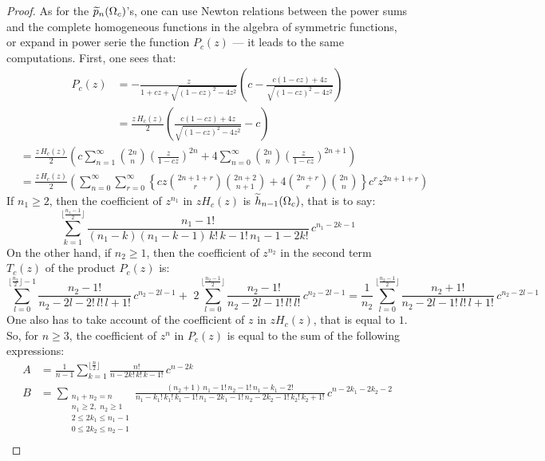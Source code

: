 \documentclass[10pt]{amsart}
\begin{document}
\begin{proof}
As for the $\widetilde{p}_{n}(\Omega_{c})$'s, one can use Newton relations between the power sums and the complete homogeneous functions in the algebra of symmetric functions, or expand in power serie the function $P_{c}(z)$ --- it leads to the same computations. First, one sees that:
\begin{align*}P_{c}(z)&=-\frac{z}{1+cz+\sqrt{(1-cz)^{2}-4z^{2}}}\left(c - \frac{c(1-cz)+4z}{\sqrt{(1-cz)^{2}-4z^{2}}}\right)\\
&=\frac{z\,H_{c}(z)}{2}\left(\frac{c(1-cz)+4z}{\sqrt{(1-cz)^{2}-4z^{2}}}-c\right)\end{align*}
\begin{align*}
&=\frac{z\,H_{c}(z)}{2}\left(c\sum_{n=1}^{\infty}\binom{2n}{n}\left(\frac{z}{1-cz}\right)^{2n}+4\sum_{n=0}^{\infty}\binom{2n}{n}\left(\frac{z}{1-cz}\right)^{2n+1}\right)\\
&=\frac{z\,H_{c}(z)}{2}\left(\sum_{n=0}^{\infty}\sum_{r=0}^{\infty}\left\{cz\binom{2n+1+r}{r}\binom{2n+2}{n+1}+ 4\binom{2n+r}{r}\binom{2n}{n}\right\}c^{r}z^{2n+1+r}\right)
\end{align*}
If $n_{1}\geq 2$, then the coefficient of $z^{n_{1}}$ in $zH_{c}(z)$ is $\widetilde{h}_{n-1}(\Omega_{c})$, that is to say:
$$ \sum_{k=1}^{\lfloor \frac{n_{1}-1}{2}\rfloor} \frac{n_{1}-1!}{(n_{1}-k)(n_{1}-k-1)\,k!\,k-1!\,n_{1}-1-2k!}\,c^{n_{1}-2k-1}$$
On the other hand, if $n_{2} \geq 1$, then the coefficient of $z^{n_{2}}$ in the second term $T_{c}(z)$ of the product $P_{c}(z)$ is: 
$$\sum_{l=0}^{\lfloor \frac{n_{2}}{2}\rfloor-1}\!\!\!\!\frac{n_{2}-1!}{n_{2}-2l-2!\,l!\,l+1!}\,c^{n_{2}-2l-1}+\,\,2\!\!\sum_{l=0}^{\lfloor\frac{n_{2}-1}{2} \rfloor}\!\!\!\!\frac{n_{2}-1!}{n_{2}-2l-1!\,l!\,l!}\,c^{n_{2}-2l-1}=\frac{1}{n_{2}}\!\!\sum_{l=0}^{\lfloor\frac{n_{2}-1}{2}\rfloor}\!\!\!\! \frac{n_{2}+1!}{n_{2}-2l-1!\,l!\,l+1!}\,c^{n_{2}-2l-1}$$
One also has to take account of the coefficient of $z$ in $zH_{c}(z)$, that is equal to $1$. So, for $n \geq 3$, the coefficient of $z^{n}$ in $P_{c}(z)$ is equal to the sum of the following expressions:
\begin{align*}
A&=\frac{1}{n-1}\sum_{k=1}^{\lfloor\frac{n}{2} \rfloor} \frac{n!}{n-2k!\,k!\,k-1!}\,c^{n-2k}\\
B&=\!\!\!\!\!\!\sum_{\substack{n_{1}+n_{2}=n\\n_{1}\geq 2,\,\,n_{2}\geq 1\\2\leq 2k_{1}\leq n_{1}-1\\ 0 \leq 2k_{2} \leq n_{2}-1}}\frac{(n_{2}+1)\,n_{1}-1!\,n_{2}-1!\,n_{1}-k_{1}-2!}{n_{1}-k_{1}!\,k_{1}!\,k_{1}-1!\, n_{1}-2k_{1}-1!\,n_{2}-2k_{2}-1!\,k_{2}!\,k_{2}+1!}\,c^{n-2k_{1}-2k_{2}-2}\\

\end{align*}
\end{proof}
\end{document}
